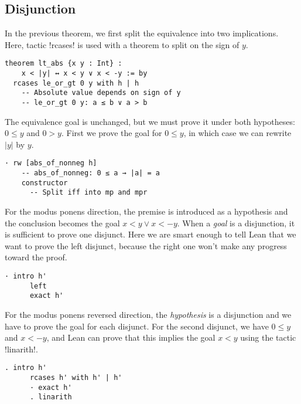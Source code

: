 


\subsection{Disjunction}

In the previous theorem, we first split the equivalence into two implications. Here, tactic !rcases! is used with a theorem to split on the sign of $y$. \begin{Verbatim}
theorem lt_abs {x y : Int} :
    x < |y| ↔ x < y ∨ x < -y := by
  rcases le_or_gt 0 y with h | h
    -- Absolute value depends on sign of y
    -- le_or_gt 0 y: a ≤ b ∨ a > b
\end{Verbatim}

The equivalence goal is unchanged, but we must prove it under both hypotheses: $0\leq y$ and $0>y$. First we prove the goal for $0\leq y$, in which case we can rewrite $|y|$ by $y$.
\begin{Verbatim}[firstnumber=last]
  · rw [abs_of_nonneg h]
    -- abs_of_nonneg: 0 ≤ a → |a| = a
    constructor
      -- Split iff into mp and mpr
\end{Verbatim}
For the modus ponens direction, the premise is introduced as a hypothesis and the  conclusion becomes the goal $x < y \vee x < -y$. When a \emph{goal} is a disjunction, it is sufficient to prove one disjunct. Here we are smart enough to tell Lean that we want to prove the left disjunct, because the right one won't make any progress toward the proof.
\begin{Verbatim}[firstnumber=last]
    · intro h'
      left
      exact h'
\end{Verbatim}
For the modus ponens reversed direction, the \emph{hypothesis} is a disjunction and we have to prove the goal for each disjunct. For the second disjunct, we have $0 \le y$ and $x < -y$, and Lean can prove that this implies the goal $x < y$ using the tactic !linarith!.

\begin{Verbatim}[firstnumber=last]
    . intro h'
      rcases h' with h' | h'
      · exact h'
      . linarith
\end{Verbatim}

